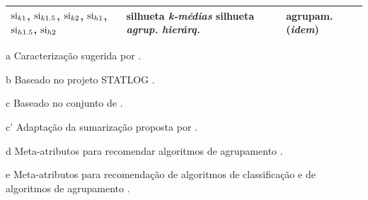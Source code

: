 \begin{quadro}
\begin{threeparttable}
\begin{tabular}{|p{3.6cm}|p{4.6cm}|m{6cm}|}
$\operatorname*{si}_{k1}$, \phantom{aa}$\operatorname*{si}_{k1.5}$, \phantom{aa}$\operatorname*{si}_{k2}$,
$\operatorname*{si}_{h1}$, \phantom{aa}$\operatorname*{si}_{h1.5}$, \phantom{aa}$\operatorname*{si}_{h2}$ &
silhueta\tnote{e}\phantom{e} \textit{k-médias} \phantom{ooooo}
silhueta \textit{agrup. hierárq.} &
agrupam. \cite{rousseeuw1987silhouettes} (\textit{idem}) \\ \hline

\end{tabular}
\begin{tablenotes}
\item [a] Caracterização sugerida por .
\item [b] Baseado no projeto STATLOG \cite{brazdil1994analysis}.
\item [c] Baseado no conjunto de .
\item [c'] Adaptação da sumarização proposta por .
\item [d] Meta-atributos para recomendar algoritmos de agrupamento \cite{conf/ijcnn/SoutoPSACLS08}.
\item [e] Meta-atributos para recomendação de algoritmos de classificação \cite{souza2010meta}
e de algoritmos de agrupamento \cite{Ferrari2015181}.
\end{tablenotes}
\end{threeparttable}

\end{quadro}

